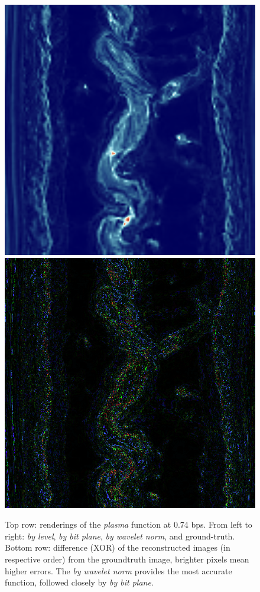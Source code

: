 \begin{figure}[h] {\includegraphics[width=0.24\linewidth]{img/rmse/plasma_curr_func2.png}}
	{\includegraphics[width=0.24\linewidth]{img/rmse/plasma_curr_func0_diff.png}} \caption{Top row:
	renderings of the \emph{plasma} function at 0.74 bps. From left to right: \emph{by level},
	\emph{by bit plane}, \emph{by wavelet norm}, and ground-truth. Bottom row: difference (XOR) of the
	reconstructed images (in respective order) from the groundtruth image, brighter pixels mean higher
	errors. The \emph{by wavelet norm} provides the most accurate function, followed closely by
	\emph{by bit plane}.}
 	\label{fig:rmse-rendering}
\end{figure}
